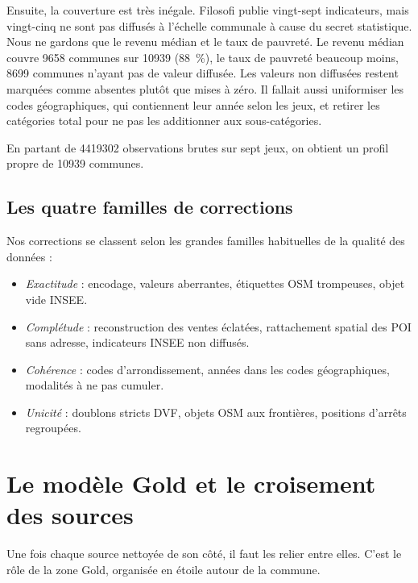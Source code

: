 \documentclass[11pt,a4paper]{article}
\begin{document}
Ensuite, la couverture est très inégale. Filosofi publie vingt-sept indicateurs, mais vingt-cinq ne sont pas diffusés à l'échelle communale à cause du secret statistique. Nous ne gardons que le revenu médian et le taux de pauvreté. Le revenu médian couvre \num{9658} communes sur \num{10939} (\SI{88}{\percent}), le taux de pauvreté beaucoup moins, \num{8699} communes n'ayant pas de valeur diffusée. Les valeurs non diffusées restent marquées comme absentes plutôt que mises à zéro. Il fallait aussi uniformiser les codes géographiques, qui contiennent leur année selon les jeux, et retirer les catégories \og total \fg{} pour ne pas les additionner aux sous-catégories.

En partant de \num{4419302} observations brutes sur sept jeux, on obtient un profil propre de \num{10939} communes.

\subsection{Les quatre familles de corrections}

Nos corrections se classent selon les grandes familles habituelles de la qualité des données :

\begin{itemize}
  \item \emph{Exactitude} : encodage, valeurs aberrantes, étiquettes OSM trompeuses, objet vide INSEE.
  \item \emph{Complétude} : reconstruction des ventes éclatées, rattachement spatial des POI sans adresse, indicateurs INSEE non diffusés.
  \item \emph{Cohérence} : codes d'arrondissement, années dans les codes géographiques, modalités à ne pas cumuler.
  \item \emph{Unicité} : doublons stricts DVF, objets OSM aux frontières, positions d'arrêts regroupées.
\end{itemize}

\section{Le modèle Gold et le croisement des sources}

Une fois chaque source nettoyée de son côté, il faut les relier entre elles. C'est le rôle de la zone Gold, organisée en étoile autour de la commune.
\end{document}
